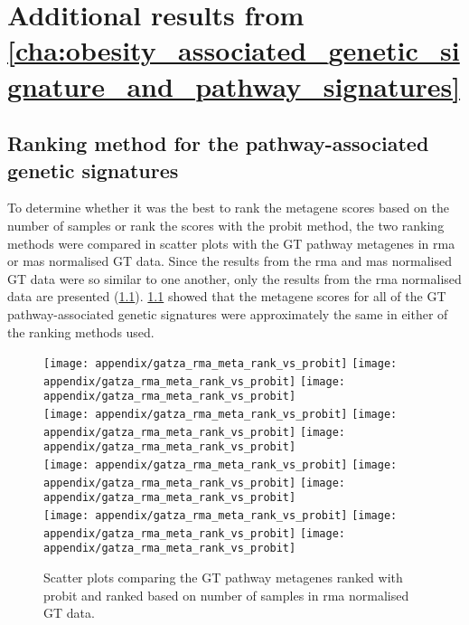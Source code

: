 
	\chapter{Additional results from \cref{cha:obesity_associated_genetic_signature_and_pathway_signatures}}
	\label{app:b}

	\section{Ranking method for the pathway-associated genetic signatures}
	\label{sec:ranking_method_for_the_pathway_associated_genetic_signatures}

	To determine whether it was the best to rank the metagene scores based on the number of samples or rank the scores with the probit method, the two ranking methods were compared in scatter plots with the GT pathway metagenes in \gls{rma} or \gls{mas} normalised GT data.
	Since the results from the \gls{rma} and \gls{mas} normalised GT data were so similar to one another, only the results from the \gls{rma} normalised data are presented (\cref{fig:appendix/rank_scatter}).
	\cref{fig:appendix/rank_scatter} showed that the metagene scores for all of the GT pathway-associated genetic signatures were approximately the same in either of the ranking methods used.

	\begin{figure}[htp!]
		\centering
		\texttt{[image: appendix/gatza\_rma\_meta\_rank\_vs\_probit]}
		\texttt{[image: appendix/gatza\_rma\_meta\_rank\_vs\_probit]}
		\texttt{[image: appendix/gatza\_rma\_meta\_rank\_vs\_probit]}\\
		\texttt{[image: appendix/gatza\_rma\_meta\_rank\_vs\_probit]}
		\texttt{[image: appendix/gatza\_rma\_meta\_rank\_vs\_probit]}
		\texttt{[image: appendix/gatza\_rma\_meta\_rank\_vs\_probit]}\\
		\texttt{[image: appendix/gatza\_rma\_meta\_rank\_vs\_probit]}
		\texttt{[image: appendix/gatza\_rma\_meta\_rank\_vs\_probit]}
		\texttt{[image: appendix/gatza\_rma\_meta\_rank\_vs\_probit]}\\
		\texttt{[image: appendix/gatza\_rma\_meta\_rank\_vs\_probit]}
		\texttt{[image: appendix/gatza\_rma\_meta\_rank\_vs\_probit]}
		\texttt{[image: appendix/gatza\_rma\_meta\_rank\_vs\_probit]}\\
		\caption[Comparison of the ranking methods for the pathway metagenes in the \acrshort{rma}-normalised GT data]{Scatter plots comparing the GT pathway metagenes ranked with probit and ranked based on number of samples in \gls{rma} normalised GT data. }
		\label{fig:appendix/rank_scatter}
	\end{figure}

